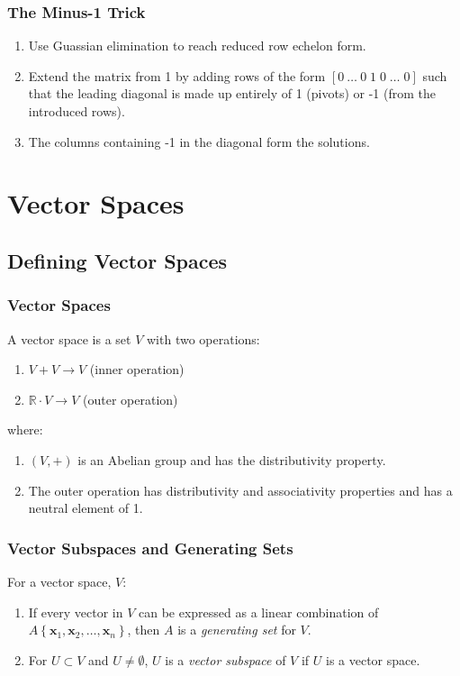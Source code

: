 \documentclass[10pt,twoside,twocolumn]{article}
\newcommand{\R}[0]{\mathds{R}} %
\begin{document}
\subsubsection{The Minus-1 Trick}
\begin{enumerate}
\item Use Guassian elimination to reach reduced row echelon form. 
\item Extend the matrix from 1 by adding rows of the form $\left[0\:\dots\:0\;1\;0\;\dots\;0\right]$
such that the leading diagonal is made up entirely of 1 (pivots) or
-1 (from the introduced rows). 
\item The columns containing -1 in the diagonal form the solutions. 
\end{enumerate}

\section{Vector Spaces}


\subsection{Defining Vector Spaces}


\subsubsection{Vector Spaces}

A vector space is a set $V$ with two operations: 
\begin{enumerate}
\item $V+V\rightarrow V$ (inner operation) 
\item $\R\cdot V\rightarrow V$ (outer operation) 
\end{enumerate}
where: 
\begin{enumerate}
\item $\left(V,+\right)$ is an Abelian group and has the distributivity
property. 
\item The outer operation has distributivity and associativity properties
and has a neutral element of 1. 
\end{enumerate}

\subsubsection{Vector Subspaces and Generating Sets}

For a vector space, $V$: 
\begin{enumerate}
\item If every vector in $V$ can be expressed as a linear combination of
$A\left\{ \mathbf{x}_{1},\mathbf{x}_{2},\dots,\mathbf{x}_{n}\right\} $,
then $A$ is a \emph{generating set} for $V$. 
\item For $U\subset V$ and $U\neq\emptyset$, $U$ is a \emph{vector subspace}
of $V$ if $U$ is a vector space. 
\end{enumerate}
\end{document}
